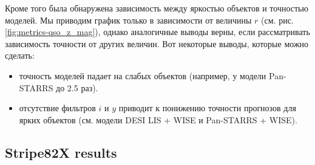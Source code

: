 \documentclass[fleqn,usenatbib]{mnras}
\begin{document}

Кроме того была обнаружена зависимость между яркостью объектов и точностью моделей. Мы приводим график только в зависимости от величины $r$ (см. рис. \ref{fig:metrics-qso_z_mag}), однако аналогичные выводы верны, если рассматривать зависимость точности от других величин. Вот некоторые выводы, которые можно сделать:
\begin{itemize}
    \item точность моделей падает на слабых объектов (например, у модели Pan-STARRS до 2.5 раз).
    \item отсутствие фильтров $i$ и $y$ приводит к понижению точности прогнозов для ярких объектов (см. модели DESI LIS + WISE и Pan-STARRS + WISE).
\end{itemize}


\subsection{Stripe82X results}\label{subsec:s82x_results}
\end{document}
